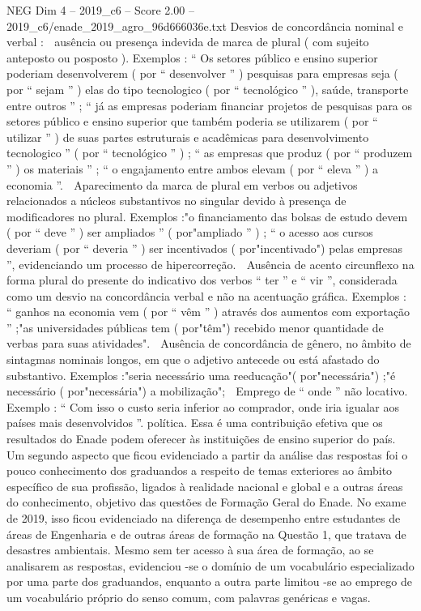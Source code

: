 \begin{textsample}{NEG Dim 4 – 2019\_c6 – Score 2.00 – 2019\_c6/enade\_2019\_agro\_96d666036e.txt}
Desvios de concordância nominal e verbal :  ausência ou presença indevida de marca de plural ( com sujeito anteposto ou posposto ).
Exemplos : “ Os setores público e ensino superior poderiam desenvolverem ( por “ desenvolver ” ) pesquisas para empresas seja ( por “ sejam ” ) elas do tipo tecnologico ( por “ tecnológico ” ), saúde, transporte entre outros ” ; “ já as empresas poderiam financiar projetos de pesquisas para os setores público e ensino superior que também poderia se utilizarem ( por “ utilizar ” ) de suas partes estruturais e acadêmicas para desenvolvimento tecnologico ” ( por “ tecnológico ” ) ; “ as empresas que produz ( por “ produzem ” ) os materiais ” ; “ o engajamento entre ambos elevam ( por “ eleva ” ) a economia ”.  Aparecimento da marca de plural em verbos ou adjetivos relacionados a núcleos substantivos no singular devido à presença de modificadores no plural.
Exemplos :"o financiamento das bolsas de estudo devem ( por “ deve ” ) ser ampliados ” ( por"ampliado ” ) ; “ o acesso aos cursos deveriam ( por “ deveria ” ) ser incentivados ( por"incentivado") pelas empresas ”, evidenciando um processo de hipercorreção.  Ausência de acento circunflexo na forma plural do presente do indicativo dos verbos “ ter ” e “ vir ”, considerada como um desvio na concordância verbal e não na acentuação gráfica.
Exemplos : “ ganhos na economia vem ( por “ vêm ” ) através dos aumentos com exportação ” ;"as universidades públicas tem ( por"têm") recebido menor quantidade de verbas para suas atividades".  Ausência de concordância de gênero, no âmbito de sintagmas nominais longos, em que o adjetivo antecede ou está afastado do substantivo.
Exemplos :"seria necessário uma reeducação"( por"necessária") ;"é necessário ( por"necessária") a mobilização";  Emprego de “ onde ” não locativo.
Exemplo : “ Com isso o custo seria inferior ao comprador, onde iria igualar aos países mais desenvolvidos ”. política.
Essa é uma contribuição efetiva que os resultados do Enade podem oferecer às instituições de ensino superior do país.
Um segundo aspecto que ficou evidenciado a partir da análise das respostas foi o pouco conhecimento dos graduandos a respeito de temas exteriores ao âmbito específico de sua profissão, ligados à realidade nacional e global e a outras áreas do conhecimento, objetivo das questões de Formação Geral do Enade.
No exame de 2019, isso ficou evidenciado na diferença de desempenho entre estudantes de áreas de Engenharia e de outras áreas de formação na Questão 1, que tratava de desastres ambientais.
Mesmo sem ter acesso à sua área de formação, ao se analisarem as respostas, evidenciou -se o domínio de um vocabulário especializado por uma parte dos graduandos, enquanto a outra parte limitou -se ao emprego de um vocabulário próprio do senso comum, com palavras genéricas e vagas.

\end{textsample}
